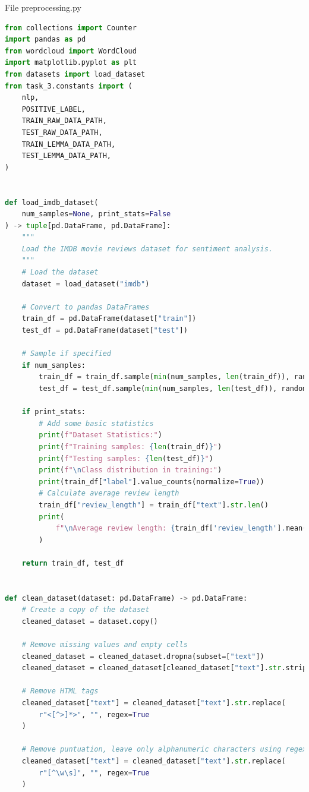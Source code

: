 \documentclass[12pt]{article}
\begin{document}
File preprocessing.py
\begin{lstlisting}[language=Python]
from collections import Counter
import pandas as pd
from wordcloud import WordCloud
import matplotlib.pyplot as plt
from datasets import load_dataset
from task_3.constants import (
    nlp,
    POSITIVE_LABEL,
    TRAIN_RAW_DATA_PATH,
    TEST_RAW_DATA_PATH,
    TRAIN_LEMMA_DATA_PATH,
    TEST_LEMMA_DATA_PATH,
)

    
def load_imdb_dataset(
    num_samples=None, print_stats=False
) -> tuple[pd.DataFrame, pd.DataFrame]:
    """
    Load the IMDB movie reviews dataset for sentiment analysis.
    """
    # Load the dataset
    dataset = load_dataset("imdb")

    # Convert to pandas DataFrames
    train_df = pd.DataFrame(dataset["train"])
    test_df = pd.DataFrame(dataset["test"])

    # Sample if specified
    if num_samples:
        train_df = train_df.sample(min(num_samples, len(train_df)), random_state=42)
        test_df = test_df.sample(min(num_samples, len(test_df)), random_state=42)

    if print_stats:
        # Add some basic statistics
        print(f"Dataset Statistics:")
        print(f"Training samples: {len(train_df)}")
        print(f"Testing samples: {len(test_df)}")
        print(f"\nClass distribution in training:")
        print(train_df["label"].value_counts(normalize=True))
        # Calculate average review length
        train_df["review_length"] = train_df["text"].str.len()
        print(
            f"\nAverage review length: {train_df['review_length'].mean():.0f} characters"
        )

    return train_df, test_df


def clean_dataset(dataset: pd.DataFrame) -> pd.DataFrame:
    # Create a copy of the dataset
    cleaned_dataset = dataset.copy()

    # Remove missing values and empty cells
    cleaned_dataset = cleaned_dataset.dropna(subset=["text"])
    cleaned_dataset = cleaned_dataset[cleaned_dataset["text"].str.strip().astype(bool)]

    # Remove HTML tags
    cleaned_dataset["text"] = cleaned_dataset["text"].str.replace(
        r"<[^>]*>", "", regex=True
    )

    # Remove puntuation, leave only alphanumeric characters using regex
    cleaned_dataset["text"] = cleaned_dataset["text"].str.replace(
        r"[^\w\s]", "", regex=True
    )


\end{lstlisting}
\end{document}
